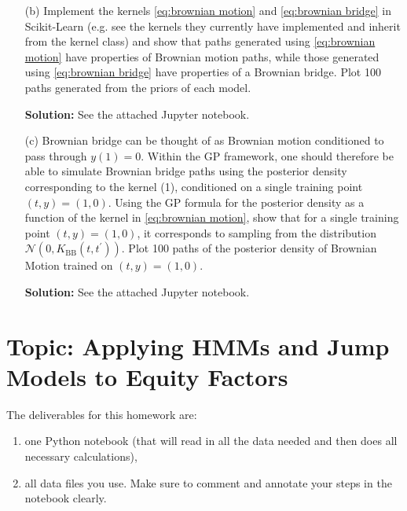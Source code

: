 \documentclass[11pt]{article}
\theoremstyle{plain} %
\newenvironment{solution}
{\color{C2}\normalfont\begin{framed}\begingroup\textbf{Solution:} }
  {\endgroup\end{framed}}
\theoremstyle{remark}
\begin{document}
\begin{enumerate}
\begin{solution}
    \end{solution}
    \item[(b)] Implement the kernels \cref{eq:brownian motion} and \cref{eq:brownian bridge} in Scikit-Learn (e.g. see the
    kernels they currently have implemented and inherit from the kernel class)
    and show that paths generated using \cref{eq:brownian motion} have properties of Brownian motion
    paths, while those generated using \cref{eq:brownian bridge} have properties of a Brownian bridge.
    Plot 100 paths generated from the priors of each model.
    
    \begin{solution}
      See the attached Jupyter notebook.
    \end{solution}
    \item[(c)] Brownian bridge can be thought of as Brownian motion conditioned
    to pass through \( y(1)=0 \). Within the GP framework, one should therefore
    be able to simulate Brownian bridge paths using the posterior density
    corresponding to the kernel (1), conditioned on a single training point \(
    (t, y)=(1,0) \). Using the GP formula for the posterior density as a
    function of the kernel in \cref{eq:brownian motion}, show that for a single training point \( (t,
    y)=(1,0) \), it corresponds to sampling from the distribution \(
    \mathcal{N}\left(0, K_{\mathrm{BB}}\left(t, t^{\prime}\right)\right) \).
    Plot 100 paths of the posterior density of Brownian Motion trained on \( (t,
    y)=(1,0) \).
    \begin{solution}
      See the attached Jupyter notebook.
    \end{solution}
\end{enumerate}




\section{Topic: Applying HMMs and Jump Models to Equity Factors}

The deliverables for this homework are: 
\begin{enumerate}
  \item one Python notebook (that will read in all the data needed and then does
  all necessary calculations),
  \item all data files you use. Make sure to comment and annotate your steps in
  the notebook clearly.
\end{enumerate}
\end{document}
